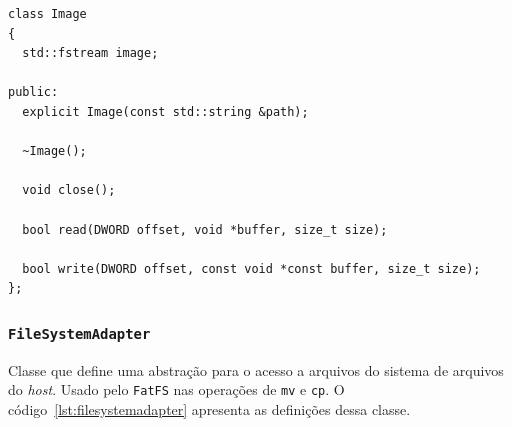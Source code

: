 \documentclass[
    12pt,				%
    oneside,   	        %
    a4paper,			%
    english,			%
    french,				%
    spanish,			%
    brazil,				%
    ]{pacotes/abntex2}
\begin{document}
\begin{lstlisting}[caption={Classe para interação do arquivo \texttt{.img} que contém o FAT32 gravado}, label={lst:image}]
class Image
{
  std::fstream image;

public:
  explicit Image(const std::string &path);
  
  ~Image();
  
  void close();
  
  bool read(DWORD offset, void *buffer, size_t size);
  
  bool write(DWORD offset, const void *const buffer, size_t size);
};
\end{lstlisting}

\subsubsection{\texttt{FileSystemAdapter}}
\label{subsubsec:file_system_adapter}

Classe que define uma abstração para o acesso a arquivos do sistema de arquivos do \textit{host}. Usado pelo \texttt{FatFS} nas operações de \texttt{mv} e \texttt{cp}. O código~\ref{lst:filesystemadapter} apresenta as definições dessa classe.
\end{document}
